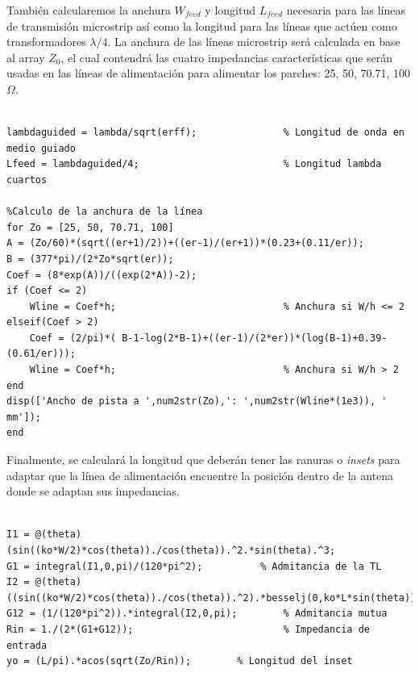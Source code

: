\par También calcularemos la anchura $W_{feed}$ y longitud $L_{feed}$ necesaria para las líneas de transmisión microstrip así como la longitud para las líneas que actúen como transformadores $\lambda /4$. La anchura de las líneas microstrip será calculada en base al array $Z_{0}$, el cual contendrá las cuatro impedancias características que serán usadas en las líneas de alimentación para alimentar los parches: 25, 50, 70.71, 100 $\Omega$.

\begin{lstlisting}[style=Matlab-color, caption={Parámetros de diseño de la línea de alimentación},label=alimentacion]
%% Cálculos de línea de alimentación

lambdaguided = lambda/sqrt(erff);               % Longitud de onda en medio guiado
Lfeed = lambdaguided/4;                         % Longitud lambda cuartos

%Calculo de la anchura de la línea
for Zo = [25, 50, 70.71, 100]
A = (Zo/60)*(sqrt((er+1)/2))+((er-1)/(er+1))*(0.23+(0.11/er)); 
B = (377*pi)/(2*Zo*sqrt(er));
Coef = (8*exp(A))/((exp(2*A))-2);
if (Coef <= 2)
    Wline = Coef*h;                             % Anchura si W/h <= 2
elseif(Coef > 2)
    Coef = (2/pi)*( B-1-log(2*B-1)+((er-1)/(2*er))*(log(B-1)+0.39-(0.61/er)));
    Wline = Coef*h;                             % Anchura si W/h > 2
end
disp(['Ancho de pista a ',num2str(Zo),': ',num2str(Wline*(1e3)), ' mm']);
end
\end{lstlisting}

\par Finalmente, se calculará la longitud que deberán tener las ranuras o \textit{insets} para adaptar que la línea de alimentación encuentre la posición dentro de la antena donde se adaptan sus impedancias.

\begin{lstlisting}[style=Matlab-color, caption={Parámetros de diseño del \textit{inset}},label=inset]
%% Inset

I1 = @(theta) (sin((ko*W/2)*cos(theta))./cos(theta)).^2.*sin(theta).^3;
G1 = integral(I1,0,pi)/(120*pi^2);          % Admitancia de la TL
I2 = @(theta) ((sin((ko*W/2)*cos(theta))./cos(theta)).^2).*besselj(0,ko*L*sin(theta)).*sin(theta).^3;
G12 = (1/(120*pi^2)).*integral(I2,0,pi);        % Admitancia mutua
Rin = 1./(2*(G1+G12));                          % Impedancia de entrada
yo = (L/pi).*acos(sqrt(Zo/Rin));        % Longitud del inset
\end{lstlisting}

